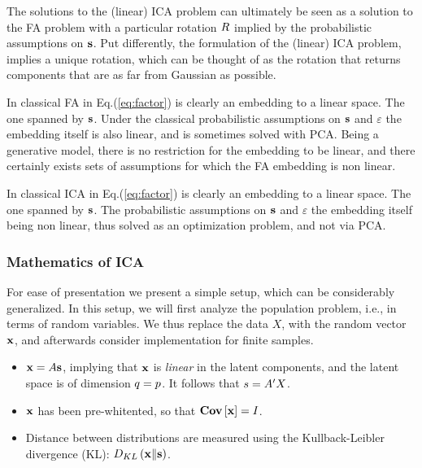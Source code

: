 \documentclass[12pt,a4paper]{article}
\begin{document}
\begin{remark}
	The solutions to the (linear) ICA problem can ultimately be seen as a solution to the FA problem with a particular rotation $R$ implied by the probabilistic assumptions on $\mathbf{s}$.
	Put differently, the formulation of the (linear) ICA problem, implies a unique rotation, which can be thought of as the rotation that returns components that are as far from Gaussian as possible. 
\end{remark}


\begin{remark}
	In classical FA in Eq.(\ref{eq:factor}) is clearly an embedding to a linear space. 
	The one spanned by $\mathbf{s}$. 
	Under the classical probabilistic assumptions on $\mathbf{s}$ and $\varepsilon$ the embedding itself is also linear, and is sometimes solved with PCA. 
	Being a generative model, there is no restriction for the embedding to be linear, and there certainly exists sets of assumptions for which the FA embedding is non linear. 
\end{remark}


\begin{remark}
	In classical ICA in Eq.(\ref{eq:factor}) is clearly an embedding to a linear space. 
	The one spanned by $\mathbf{s}$. 
	The probabilistic assumptions on $\mathbf{s}$ and $\varepsilon$ the embedding itself being non linear, thus solved as an optimization problem, and not via PCA. 
\end{remark}




\subsubsection{Mathematics of ICA}
For ease of presentation we present a simple setup, which can be considerably generalized. 
In this setup, we will first analyze the population problem, i.e., in terms of random variables. 
We thus replace the data $X$, with the random vector $\mathbf{x}$, and afterwards consider implementation for finite samples. 
\begin{itemize}
	\item $\mathbf{x}=A \mathbf{s}$, implying that $\mathbf{x}$ is \emph{linear} in the latent components, and the latent space is of dimension $q=p$. It follows that $s=A'X$.
	\item $\mathbf{x}$ has been pre-whitented, so that $\mathbf{Cov} \left[ \mathbf{x} \right]=I$.
	\item Distance between distributions are measured using the Kullback-Leibler divergence (KL): $D_{KL}\left(\mathbf{x} \Vert \mathbf{s} \right)$.
\end{itemize}
\end{document}
